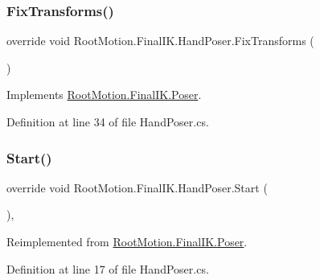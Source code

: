 \subsubsection{\texorpdfstring{Fix\+Transforms()}{FixTransforms()}}
{\footnotesize\ttfamily override void Root\+Motion.\+Final\+I\+K.\+Hand\+Poser.\+Fix\+Transforms (\begin{DoxyParamCaption}{ }\end{DoxyParamCaption})\hspace{0.3cm}{\ttfamily [virtual]}}



Implements \mbox{\hyperlink{class_root_motion_1_1_final_i_k_1_1_poser_ad80c2188b9a1855ff78f3dadba42362d}{Root\+Motion.\+Final\+I\+K.\+Poser}}.



Definition at line 34 of file Hand\+Poser.\+cs.

\mbox{\label{class_root_motion_1_1_final_i_k_1_1_hand_poser_a99f98f5003f3cdedba368fafd6168234}} 
\subsubsection{\texorpdfstring{Start()}{Start()}}
{\footnotesize\ttfamily override void Root\+Motion.\+Final\+I\+K.\+Hand\+Poser.\+Start (\begin{DoxyParamCaption}{ }\end{DoxyParamCaption})\hspace{0.3cm}{\ttfamily [protected]}, {\ttfamily [virtual]}}



Reimplemented from \mbox{\hyperlink{class_root_motion_1_1_final_i_k_1_1_poser_a7efdee80ce26a62a3ec056bb4e261a1c}{Root\+Motion.\+Final\+I\+K.\+Poser}}.



Definition at line 17 of file Hand\+Poser.\+cs.

\mbox{\label{class_root_motion_1_1_final_i_k_1_1_hand_poser_a6da6c87d2f7d0eb7d3c3fb37da066ef8}} 
